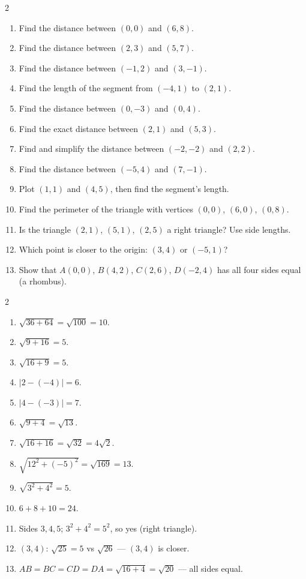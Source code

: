 \documentclass[11pt]{article}
\begin{document}
\clearpage
{}

\begin{recapbox}
\begin{multicols}{2}
\small
\begin{enumerate}[leftmargin=*,itemsep=3pt]
  \item Find the distance between $(0,0)$ and $(6,8)$.
  \item Find the distance between $(2,3)$ and $(5,7)$.
  \item Find the distance between $(-1,2)$ and $(3,-1)$.
  \item Find the length of the segment from $(-4,1)$ to $(2,1)$.
  \item Find the distance between $(0,-3)$ and $(0,4)$.
  \item Find the exact distance between $(2,1)$ and $(5,3)$.
  \item Find and simplify the distance between $(-2,-2)$ and $(2,2)$.
  \item Find the distance between $(-5,4)$ and $(7,-1)$.
  \item Plot $(1,1)$ and $(4,5)$, then find the segment's length.
  \item Find the perimeter of the triangle with vertices $(0,0)$, $(6,0)$, $(0,8)$.
  \item Is the triangle $(2,1)$, $(5,1)$, $(2,5)$ a right triangle? Use side lengths.
  \item Which point is closer to the origin: $(3,4)$ or $(-5,1)$?
  \item Show that $A(0,0)$, $B(4,2)$, $C(2,6)$, $D(-2,4)$ has all four sides equal (a rhombus).
\end{enumerate}
\end{multicols}
\end{recapbox}

\begin{keybox}
\begin{multicols}{2}
\small
\begin{enumerate}[leftmargin=*,itemsep=3pt]
  \item $\sqrt{36+64}=\sqrt{100}=10$.
  \item $\sqrt{9+16}=5$.
  \item $\sqrt{16+9}=5$.
  \item $|2-(-4)|=6$.
  \item $|4-(-3)|=7$.
  \item $\sqrt{9+4}=\sqrt{13}$.
  \item $\sqrt{16+16}=\sqrt{32}=4\sqrt2$.
  \item $\sqrt{12^2+(-5)^2}=\sqrt{169}=13$.
  \item $\sqrt{3^2+4^2}=5$.
  \item $6+8+10=24$.
  \item Sides $3,4,5$; $3^2+4^2=5^2$, so yes (right triangle).
  \item $(3,4)$: $\sqrt{25}=5$ vs $\sqrt{26}$ --- $(3,4)$ is closer.
  \item $AB=BC=CD=DA=\sqrt{16+4}=\sqrt{20}$ --- all sides equal.
\end{enumerate}
\end{multicols}
\end{keybox}
\end{document}
